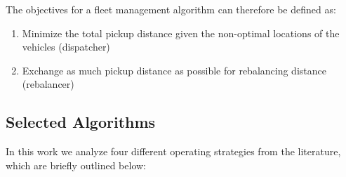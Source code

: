 The objectives for a fleet management algorithm can therefore be defined as:

\begin{enumerate}
\item Minimize the total pickup distance given the non-optimal locations of the vehicles (dispatcher)
\item Exchange as much pickup distance as possible for rebalancing distance (rebalancer)
\end{enumerate}

\subsection{Selected Algorithms}

In this work we analyze four different operating strategies from the literature,
which are briefly outlined below:

